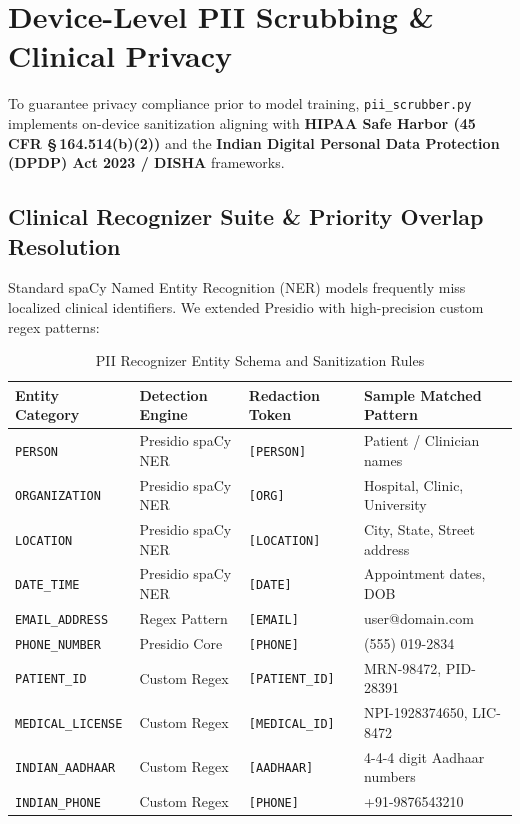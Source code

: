 \documentclass[11pt,a4paper]{article}
\begin{document}
\section{Device-Level PII Scrubbing \& Clinical Privacy}

To guarantee privacy compliance prior to model training, \texttt{pii\_scrubber.py} implements on-device sanitization aligning with \textbf{HIPAA Safe Harbor (45 CFR \S\,164.514(b)(2))} and the \textbf{Indian Digital Personal Data Protection (DPDP) Act 2023 / DISHA} frameworks.

\subsection{Clinical Recognizer Suite \& Priority Overlap Resolution}
Standard spaCy Named Entity Recognition (NER) models frequently miss localized clinical identifiers. We extended Presidio with high-precision custom regex patterns:

\begin{table}[H]
\centering
\small
\sffamily
\caption{PII Recognizer Entity Schema and Sanitization Rules}
\label{tab:pii_schema}
\begin{tabularx}{\linewidth}{p{3.2cm}p{3.2cm}p{2.8cm}X}
\toprule
\textbf{Entity Category} & \textbf{Detection Engine} & \textbf{Redaction Token} & \textbf{Sample Matched Pattern} \\
\midrule
\texttt{PERSON} & Presidio spaCy NER & \texttt{[PERSON]} & Patient / Clinician names \\
\texttt{ORGANIZATION} & Presidio spaCy NER & \texttt{[ORG]} & Hospital, Clinic, University \\
\texttt{LOCATION} & Presidio spaCy NER & \texttt{[LOCATION]} & City, State, Street address \\
\texttt{DATE\_TIME} & Presidio spaCy NER & \texttt{[DATE]} & Appointment dates, DOB \\
\texttt{EMAIL\_ADDRESS} & Regex Pattern & \texttt{[EMAIL]} & user@domain.com \\
\texttt{PHONE\_NUMBER} & Presidio Core & \texttt{[PHONE]} & (555) 019-2834 \\
\texttt{PATIENT\_ID} & Custom Regex & \texttt{[PATIENT\_ID]} & MRN-98472, PID-28391 \\
\texttt{MEDICAL\_LICENSE} & Custom Regex & \texttt{[MEDICAL\_ID]} & NPI-1928374650, LIC-8472 \\
\texttt{INDIAN\_AADHAAR} & Custom Regex & \texttt{[AADHAAR]} & 4-4-4 digit Aadhaar numbers \\
\texttt{INDIAN\_PHONE} & Custom Regex & \texttt{[PHONE]} & +91-9876543210 \\
\bottomrule
\end{tabularx}
\end{table}
\end{document}
